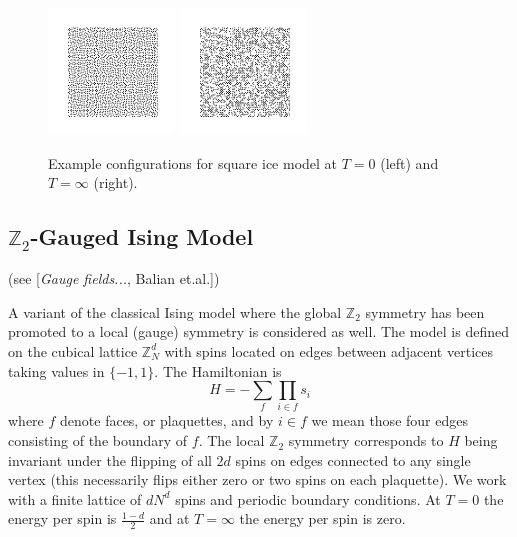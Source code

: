 \documentclass[11pt]{article}
\begin{document}
\begin{figure}[h]
    \centering
    \includegraphics[width=0.3\textwidth]{squareice_images/squareice_T=0.png}
    \includegraphics[width=0.3\textwidth]{squareice_images/squareice_T=inf.png}
    \caption{Example configurations for square ice model at $T=0$ (left) and $T=\infty$ (right).}
    \label{fig:SquareiceExampleConfigs}
\end{figure}


\subsection{$\mathbb{Z}_2$-Gauged Ising Model}
(see [\textit{Gauge fields...}, Balian et.al.])

A variant of the classical Ising model where the global $\mathbb{Z}_2$ symmetry has been promoted to a local (gauge) symmetry is considered as well. The model is defined on the cubical lattice $\mathbb{Z}_N^d$ with spins located on edges between adjacent vertices taking values in $\{{-1},1\}$. The Hamiltonian is
\begin{equation}
    H = - \sum_f\prod_{i\in f}s_i
\end{equation}
where $f$ denote faces, or plaquettes, and by $i\in f$ we mean those four edges consisting of the boundary of $f$. The local $\mathbb{Z}_2$ symmetry corresponds to $H$ being invariant under the flipping of all $2d$ spins on edges connected to any single vertex (this necessarily flips either zero or two spins on each plaquette). We work with a finite lattice of $dN^d$ spins and periodic boundary conditions. At $T=0$ the energy per spin is $\frac{1-d}{2}$ and at $T=\infty$ the energy per spin is zero.
\end{document}
